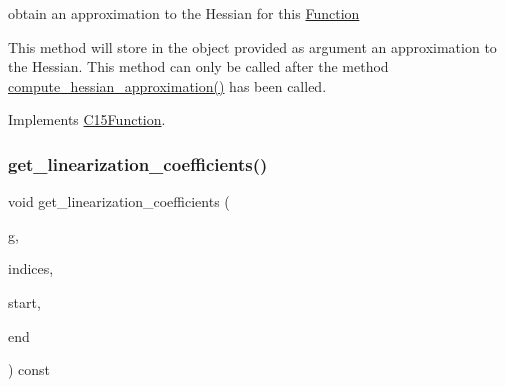 obtain an approximation to the Hessian for this \mbox{\hyperlink{class_s_m_spp__di__unipi__it_1_1_function}{Function}} 

This method will store in the object provided as argument an approximation to the Hessian. This method can only be called after the method \mbox{\hyperlink{class_s_m_spp__di__unipi__it_1_1_linear_function_a4aab1ee65194b8af72eb1c122205c707}{compute\+\_\+hessian\+\_\+approximation()}} has been called. 

Implements \mbox{\hyperlink{class_s_m_spp__di__unipi__it_1_1_c15_function_a5e5b31d85711c9e27252b7af6ff7e214}{C15\+Function}}.

\mbox{\label{class_s_m_spp__di__unipi__it_1_1_linear_function_a54ef80c96ecf7e69d077a6579de37b82}} 
\subsubsection{\texorpdfstring{get\+\_\+linearization\+\_\+coefficients()}{get\_linearization\_coefficients()}\hspace{0.1cm}{\footnotesize\ttfamily [1/4]}}
{\footnotesize\ttfamily void get\+\_\+linearization\+\_\+coefficients (\begin{DoxyParamCaption}\item[{\mbox{\hyperlink{class_s_m_spp__di__unipi__it_1_1_function_a9ad432406b609e28d340f73e9474bffe}{Function\+Value}} $\ast$}]{g,  }\item[{\mbox{\hyperlink{group___thin_var_dep_interface___c_l_a_s_s_e_s_ga03461123d4f6090aefeb97ef653d3f2b}{c\+\_\+\+Vec\+\_\+\+Index}} $\ast$const}]{indices,  }\item[{\mbox{\hyperlink{group___thin_var_dep_interface___c_l_a_s_s_e_s_gaee6156e2ce80720d57a082d80f39d8cc}{c\+\_\+\+Index}}}]{start,  }\item[{\mbox{\hyperlink{group___thin_var_dep_interface___c_l_a_s_s_e_s_gaee6156e2ce80720d57a082d80f39d8cc}{c\+\_\+\+Index}}}]{end }\end{DoxyParamCaption}) const}



